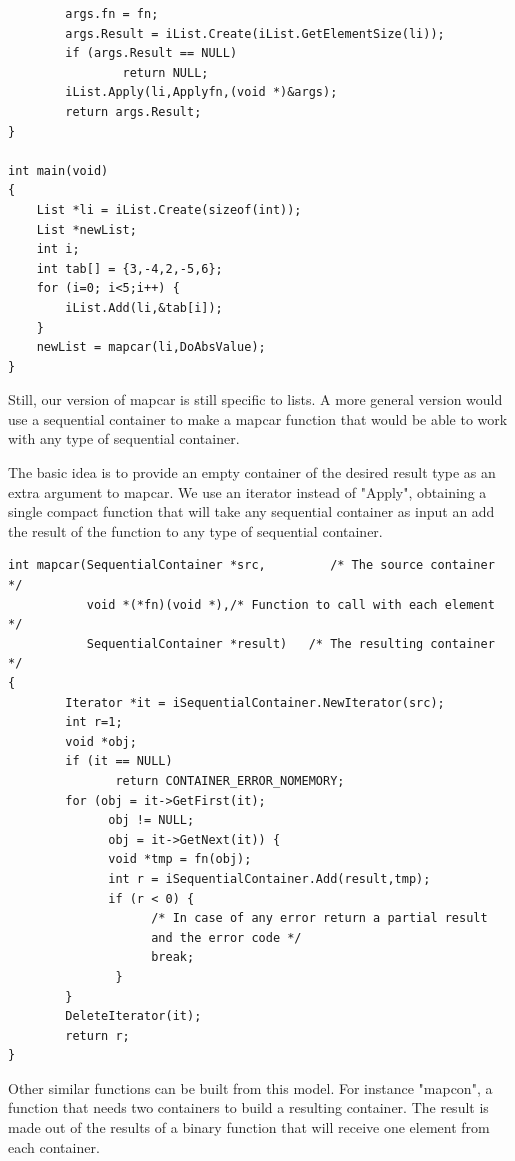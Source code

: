 \documentclass[12pt,a4paper,openany]{memoir} %
\begin{document}
{{\begin{verbatim}
        args.fn = fn;
        args.Result = iList.Create(iList.GetElementSize(li));
        if (args.Result == NULL)
                return NULL;
        iList.Apply(li,Applyfn,(void *)&args);
        return args.Result;
}

int main(void)
{
    List *li = iList.Create(sizeof(int));
    List *newList;
    int i;
    int tab[] = {3,-4,2,-5,6};
    for (i=0; i<5;i++) {
        iList.Add(li,&tab[i]);
    }
    newList = mapcar(li,DoAbsValue);
}
\end{verbatim}
Still, our version of mapcar is still specific to lists. A more general version would use a sequential container to make a mapcar function that would be able to work with any type of sequential container. 

The basic idea is to provide an empty container of the desired result type as an extra argument to mapcar. We use an iterator instead of "Apply", obtaining a single compact function that will take any sequential container as input an add the result of the function to any type of sequential container.
\begin{verbatim}
int mapcar(SequentialContainer *src,         /* The source container */
           void *(*fn)(void *),/* Function to call with each element */
           SequentialContainer *result)   /* The resulting container */
{
        Iterator *it = iSequentialContainer.NewIterator(src);
        int r=1;
        void *obj;
        if (it == NULL)
               return CONTAINER_ERROR_NOMEMORY;
        for (obj = it->GetFirst(it);
              obj != NULL;
              obj = it->GetNext(it)) {
              void *tmp = fn(obj);
              int r = iSequentialContainer.Add(result,tmp);
              if (r < 0) {
                    /* In case of any error return a partial result 
                    and the error code */
                    break;
               }
        }
        DeleteIterator(it);
        return r;
}
\end{verbatim}
Other similar functions can be built from this model. For instance "mapcon", a function that needs two containers to build a resulting container. The result is  made out of the results of a binary function that will receive one element from each container. 

}}
\end{document}
